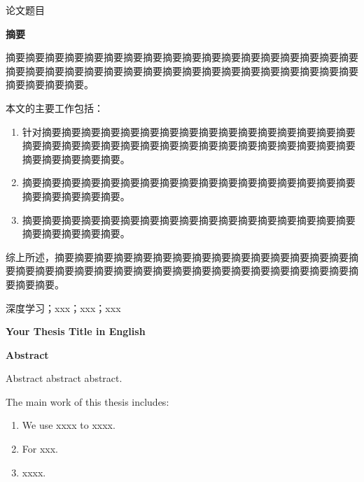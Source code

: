 \documentclass[UTF-8,a4paper,twoside]{article}
\numberwithin{equation}{section} %
\numberwithin{table}{section} %
\numberwithin{figure}{section} %
\begin{document}
\pagestyle{pre}
\thispagestyle{pre}
\begin{center}
	\heiti{}论文题目
\end{center}
\vspace{\baselineskip}
\begin{center}
	\bfseries{摘要}
\end{center}

摘要摘要摘要摘要摘要摘要摘要摘要摘要摘要摘要摘要摘要摘要摘要摘要摘要摘要摘要摘要摘要摘要摘要摘要摘要摘要摘要摘要摘要摘要摘要摘要摘要摘要摘要摘要摘要摘要摘要摘要。

本文的主要工作包括：

\begin{enumerate}[itemsep=0pt,topsep=0pt]
	\item 针对摘要摘要摘要摘要摘要摘要摘要摘要摘要摘要摘要摘要摘要摘要摘要摘要摘要摘要摘要摘要摘要摘要摘要摘要摘要摘要摘要摘要摘要摘要摘要摘要摘要摘要摘要摘要摘要摘要。
	\item 摘要摘要摘要摘要摘要摘要摘要摘要摘要摘要摘要摘要摘要摘要摘要摘要摘要摘要摘要摘要摘要摘要。
	\item 摘要摘要摘要摘要摘要摘要摘要摘要摘要摘要摘要摘要摘要摘要摘要摘要摘要摘要摘要摘要摘要摘要。
\end{enumerate}

综上所述，摘要摘要摘要摘要摘要摘要摘要摘要摘要摘要摘要摘要摘要摘要摘要摘要摘要摘要摘要摘要摘要摘要摘要摘要摘要摘要摘要摘要摘要摘要摘要摘要摘要摘要摘要摘要。

\noindent{}深度学习；xxx；xxx；xxx

\newpage
\begin{center}
	\bfseries Your Thesis Title in English
\end{center}
\vspace{\baselineskip}

\begin{center}
	\bfseries{Abstract}
\end{center}

Abstract abstract abstract.

The main work of this thesis includes:

\begin{enumerate}[itemsep=0pt,topsep=0pt]
\item We use xxxx to xxxx.
\item For xxx.
\item xxxx.
\end{enumerate}
\end{document}
